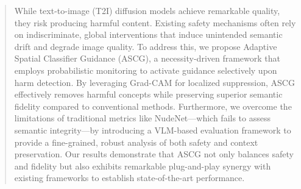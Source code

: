 \begin{abstract}
    While text-to-image (T2I) diffusion models achieve remarkable quality, they risk producing harmful content. Existing safety mechanisms often rely on indiscriminate, global interventions that induce unintended semantic drift and degrade image quality. To address this, we propose Adaptive Spatial Classifier Guidance (ASCG), a necessity-driven framework that employs probabilistic monitoring to activate guidance selectively upon harm detection. By leveraging Grad-CAM for localized suppression, ASCG effectively removes harmful concepts while preserving superior semantic fidelity compared to conventional methods. Furthermore, we overcome the limitations of traditional metrics like NudeNet—which fails to assess semantic integrity—by introducing a VLM-based evaluation framework to provide a fine-grained, robust analysis of both safety and context preservation. Our results demonstrate that ASCG not only balances safety and fidelity but also exhibits remarkable plug-and-play synergy with existing frameworks to establish state-of-the-art performance.
\end{abstract}

